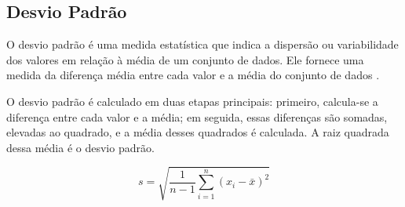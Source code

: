 \subsection{Desvio Padrão}

O desvio padrão é uma medida estatística que indica a dispersão ou variabilidade dos valores em relação à média de um conjunto de dados. Ele fornece uma medida da diferença média entre cada valor e a média do conjunto de dados \parencite{Triola2017}.

\begin{figure}[H]
    \centering
\end{figure}

O desvio padrão é calculado em duas etapas principais: primeiro, calcula-se a diferença entre cada valor e a média; em seguida, essas diferenças são somadas, elevadas ao quadrado, e a média desses quadrados é calculada. A raiz quadrada dessa média é o desvio padrão.

\[
s = \sqrt{\frac{1}{n-1} \sum_{i=1}^{n} (x_i - \bar{x})^2}
\]

